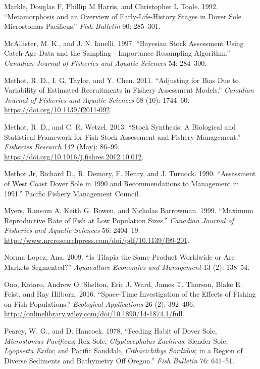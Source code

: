 \documentclass[11pt,
  english,
  a4paper,
]{article}
\begin{document}
\begin{cslreferences}
\leavevmode\hypertarget{ref-markle_metamorphosis_1992}{}%
Markle, Douglas F, Phillip M Harris, and Christopher L Toole. 1992. ``Metamorphosis and an Overview of Early-Life-History Stages in Dover Sole Microstomus Pacificus.'' \emph{Fish Bulletin} 90: 285--301.

\leavevmode\hypertarget{ref-mcallister_bayesian_1997}{}%
McAllister, M. K., and J. N. Ianelli. 1997. ``Bayesian Stock Assessment Using Catch-Age Data and the Sampling - Importance Resampling Algorithm.'' \emph{Canadian Journal of Fisheries and Aquatic Sciences} 54: 284--300.

\leavevmode\hypertarget{ref-methot_adjusting_2011}{}%
Methot, R. D., I. G. Taylor, and Y. Chen. 2011. ``Adjusting for Bias Due to Variability of Estimated Recruitments in Fishery Assessment Models.'' \emph{Canadian Journal of Fisheries and Aquatic Sciences} 68 (10): 1744--60. \url{https://doi.org/10.1139/f2011-092}.

\leavevmode\hypertarget{ref-methot_stock_2013}{}%
Methot, R. D., and C. R. Wetzel. 2013. ``Stock Synthesis: A Biological and Statistical Framework for Fish Stock Assessment and Fishery Management.'' \emph{Fisheries Research} 142 (May): 86--99. \url{https://doi.org/10.1016/j.fishres.2012.10.012}.

\leavevmode\hypertarget{ref-methot_jr_assessment_1990}{}%
Methot Jr, Richard D., R. Demory, F. Henry, and J. Turnock. 1990. ``Assessment of West Coast Dover Sole in 1990 and Recommendations to Management in 1991.'' Pacific Fishery Management Council.

\leavevmode\hypertarget{ref-myers_maximum_1999}{}%
Myers, Ransom A, Keith G. Bowen, and Nicholas Barrowman. 1999. ``Maximum Reproductive Rate of Fish at Low Population Sizes.'' \emph{Canadian Journal of Fisheries and Aquatic Sciences} 56: 2404--19. \url{http://www.nrcresearchpress.com/doi/pdf/10.1139/f99-201}.

\leavevmode\hypertarget{ref-norma-lopez_is_2009}{}%
Norma-Lopez, Ana. 2009. ``Is Tilapia the Same Product Worldwide or Are Markets Segmented?'' \emph{Aquaculture Economics and Management} 13 (2): 138--54.

\leavevmode\hypertarget{ref-ono_space-time_2016}{}%
Ono, Kotaro, Andrew O. Shelton, Eric J. Ward, James T. Thorson, Blake E. Feist, and Ray Hilborn. 2016. ``Space-Time Investigation of the Effects of Fishing on Fish Populations.'' \emph{Ecological Applications} 26 (2): 392--406. \url{http://onlinelibrary.wiley.com/doi/10.1890/14-1874.1/full}.

\leavevmode\hypertarget{ref-pearcy_feeding_1978}{}%
Pearcy, W. G., and D. Hancock. 1978. ``Feeding Habit of Dover Sole, \emph{Microstomus Pacificus}; Rex Sole, \emph{Glyptocephalus Zachirus}; Slender Sole, \emph{Lyopsetta Exilis}; and Pacific Sanddab, \emph{Citharichthys Sordidus}; in a Region of Diverse Sediments and Bathymetry Off Oregon.'' \emph{Fish Bulletin} 76: 641--51.


\end{cslreferences}
\end{document}
